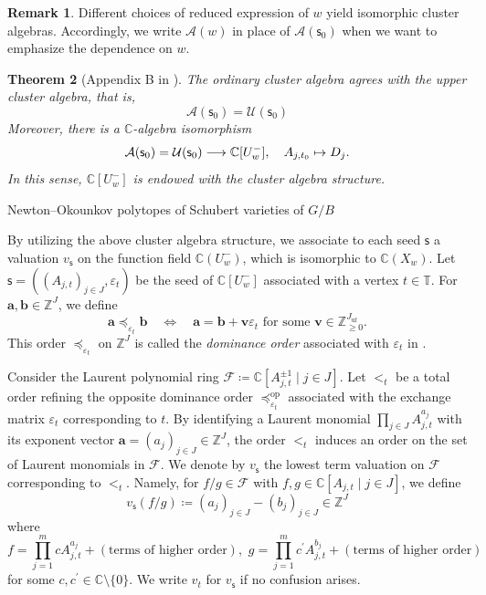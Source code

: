\documentclass[11pt]{amsart}
\makeatletter
\def\subsection{\@startsection{subsection}{2}%
  \z@{-.8\linespacing\@plus-.3\linespacing}{.3\linespacing\@plus.2\linespacing}%
  {\normalfont\bfseries}}
\newcommand{\C}{\mathbb{C}}
\newcommand{\Z}{\mathbb{Z}}
\numberwithin{equation}{section}
\theoremstyle{plain}
\newtheorem{theorem}{Theorem}[section]
\theoremstyle{definition}
\newtheorem{remark}[theorem]{Remark}
\def\to{\mathchoice{\longrightarrow}{\rightarrow}{\rightarrow}{\rightarrow}}
\numberwithin{equation}{section}
\newcommand{\uf}{\mathrm{uf}}
\newcommand{\vep}{\varepsilon}
\newcommand{\seed}{\mathsf{s}}
\newcommand{\bfa}{\mathbf{a}}
\newcommand{\bfb}{\mathbf{b}}
\makeatother
\begin{document}
\begin{remark}\label{remark_notationAw}
Different choices of reduced expression of $w$ yield isomorphic cluster algebras. Accordingly, we write $\mathcal{A}(w)$ in place of $\mathcal{A}(\seed_0)$ when we want to emphasize the dependence on $w$.
\end{remark}

\begin{theorem}[Appendix B in \cite{FO25}]\label{theorem_clustunitcell}
The ordinary cluster algebra agrees with the upper cluster algebra, that is, 
$$
\mathcal{A}(\seed_0) = \mathcal{U}(\seed_0)
$$
Moreover, there is a $\C$-algebra isomorphism 
$$
\mathcal{A}(\seed_0) = \mathcal{U}(\seed_0)  \to \C[U_w^-], \quad A_{j,t_0} \mapsto D_j.
$$
In this sense, $\C[U_w^-]$ is endowed with the cluster algebra structure.
\end{theorem}



\subsection{Newton--Okounkov polytopes of Schubert varieties of $G/B$}

By utilizing the above cluster algebra structure, we associate to each seed $\seed$ a valuation $v_\seed$ on the function field $\C(U^-_w)$, which is isomorphic to $\C(X_w)$. Let $ \seed = \left((A_{j,t})_{j \in J}, \vep_t \right)$ be the seed of $\C[ U^-_w]$ associated with a vertex $t \in \mathbb{T}$. For $\bfa, \bfb \in \Z^{J}$, we define 
$$
\bfa \preceq_{\vep_t} \bfb \quad \Longleftrightarrow \quad \bfa = \bfb + \textbf{v} \vep_t \text{ for some $\textbf{v} \in \Z_{\ge0}^{J_\uf}$.}
$$
This order $ \preceq_{\vep_t}$ on $\Z^J$ is called the \emph{dominance order} associated with $\vep_t$ in \cite{Qin17}. 

Consider the Laurent polynomial ring $\mathcal{F} \coloneqq \C[ A_{j,t}^{\pm 1} \mid j \in J ]$. Let $<_t$ be a total order refining the opposite dominance order $\preceq^{\mathrm{op}}_{\varepsilon_t}$ associated with the exchange matrix $\varepsilon_t$ corresponding to $t$. By identifying a Laurent monomial $ \prod_{j \in J} A_{j,t}^{a_j}$ with its exponent vector $\bfa = (a_j)_{j \in J} \in \Z^{J}$, the order $<_t$ induces an order on the set of Laurent monomials in $\mathcal{F}$. We denote by $ v_{\seed}$ the lowest term valuation on $\mathcal{F}$ corresponding to $<_t$. Namely, for $f/g \in \mathcal{F}$ with $f,g \in \C[A_{j,t} \mid j \in J]$, we define
$$
v_{\seed}(f/g) \coloneqq (a_j)_{j \in J} - (b_j)_{j \in J} \in \Z^{J}
$$
where 
$$
f = \prod_{j=1}^{m} c A_{j,t}^{a_j} + (\mbox{terms of higher order}), \,\, g = \prod_{j=1}^{m} c^\prime A_{j,t}^{b_j} + (\mbox{terms of higher order})
$$
for some $c, c^\prime \in \mathbb{C} \setminus \{0\}$.
We write $v_t$ for $v_{\seed}$ if no confusion arises.
\end{document}
